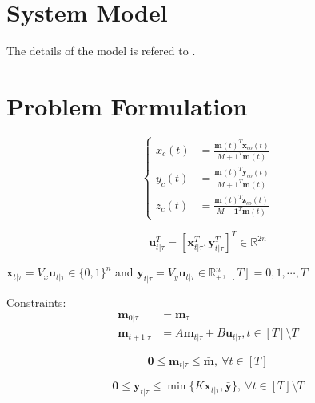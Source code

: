 \documentclass[english]{cccconf}
\begin{document}
\section{System Model}
The details of the model is refered to \cite{miao2021optimal}.



\section{Problem Formulation}

\begin{equation}\label{aircraft cg constraint}
\left\{
\begin{aligned}
x_c(t) &= \frac{\textbf{m}(t)^T\textbf{x}_{co}(t)}{M+\textbf{1}^T\textbf{m}(t)}\\
y_c(t) &= \frac{\textbf{m}(t)^T\textbf{y}_{co}(t)}{M+\textbf{1}^T\textbf{m}(t)}\\
z_c(t) &= \frac{\textbf{m}(t)^T\textbf{z}_{co}(t)}{M+\textbf{1}^T\textbf{m}(t)}
\end{aligned}
\right.
\end{equation}

\begin{equation}
  \mathbf{u}_{t|\tau}^T = \left[\mathbf{x}_{t|\tau}^T, \mathbf{y}_{t|\tau}^T\right]^T \in \mathbb{R}^{2n}
  \end{equation}

$\mathbf{x}_{t|\tau} = V_{x}\mathbf{u}_{t|\tau} \in \{0,1\}^{n}$ and $\mathbf{y}_{t|\tau} = V_{y}\mathbf{u}_{t|\tau}\in \mathbb{R}_{+}^{n}$,
$[T] = {0, 1, \cdots, T}$

Constraints:
\begin{equation}\label{fuel dynamics}
\begin{aligned}
\textbf{m}_{0|\tau} &= \textbf{m}_{\tau}\\
\textbf{m}_{t+1|\tau} &= A\textbf{m}_{t|\tau}+ B\textbf{u}_{t|\tau}, t \in [T]\setminus T
\end{aligned}
\end{equation}

\begin{equation}\label{weight constraint}
\mathbf{0} \leq \mathbf{m}_{t|\tau} \leq \bar{\mathbf{m}}, ~\forall t \in [T]
\end{equation}

\begin{equation}\label{feed constraint}
  \mathbf{0} \leq \mathbf{y}_{t|\tau} \leq \min \{K\mathbf{x}_{t|\tau},\bar{\textbf{y}}\}, ~\forall t \in [T]\setminus T
\end{equation}
\end{document}
